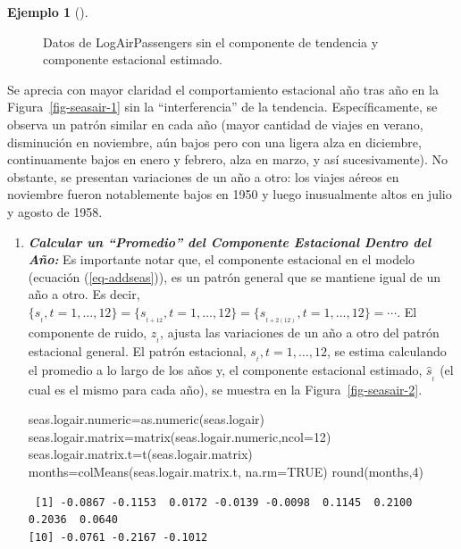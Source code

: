 \documentclass[
  us-letterpaper,
]{scrreprt}
\newenvironment{Shaded}{\begin{snugshade}}{\end{snugshade}}
\newcommand{\AttributeTok}[1]{\textcolor[rgb]{0.40,0.45,0.13}{#1}}
\newcommand{\ConstantTok}[1]{\textcolor[rgb]{0.56,0.35,0.01}{#1}}
\newcommand{\DecValTok}[1]{\textcolor[rgb]{0.68,0.00,0.00}{#1}}
\newcommand{\FunctionTok}[1]{\textcolor[rgb]{0.28,0.35,0.67}{#1}}
\newcommand{\NormalTok}[1]{\textcolor[rgb]{0.00,0.23,0.31}{#1}}
\newcommand{\OtherTok}[1]{\textcolor[rgb]{0.00,0.23,0.31}{#1}}
\theoremstyle{plain}
\theoremstyle{definition}
\theoremstyle{definition}
\newtheorem{example}{Ejemplo}[chapter]
\theoremstyle{plain}
\theoremstyle{remark}
\begin{document}
\begin{example}[]
\begin{tcolorbox}
\begin{figure}[H]
\caption{\label{fig-seasair}Datos de LogAirPassengers sin el componente
de tendencia y componente estacional estimado.}

\end{figure}%

Se aprecia con mayor claridad el comportamiento estacional año tras año
en la Figura~\ref{fig-seasair-1} sin la ``interferencia'' de la
tendencia. Específicamente, se observa un patrón similar en cada año
(mayor cantidad de viajes en verano, disminución en noviembre, aún bajos
pero con una ligera alza en diciembre, continuamente bajos en enero y
febrero, alza en marzo, y así sucesivamente). No obstante, se presentan
variaciones de un año a otro: los viajes aéreos en noviembre fueron
notablemente bajos en 1950 y luego inusualmente altos en julio y agosto
de 1958.

\begin{enumerate}
\def\labelenumi{\alph{enumi}.}
\setcounter{enumi}{2}
\item
  \textbf{\emph{Calcular un ``Promedio'' del Componente Estacional
  Dentro del Año:}} Es importante notar que, el componente estacional en
  el modelo (ecuación (\ref{eq-addseas})), es un patrón general que se
  mantiene igual de un año a otro. Es
  decir,\(\{s_{_t}, t=1,\ldots,12\} = \{s_{_{t+12}},t=1,\ldots,12\} =\{s_{_{t+2(12)}}, t=1,\ldots,12\}=\cdots.\)
  El componente de ruido, \(z_{_t}\), ajusta las variaciones de un año a
  otro del patrón estacional general. El patrón estacional,
  \(s_{_t}, t=1,\ldots,12\), se estima calculando el promedio a lo largo
  de los años y, el componente estacional estimado, \(\hat{s}_{_t}\) (el
  cual es el mismo para cada año), se muestra en la
  Figura~\ref{fig-seasair-2}.

\begin{Shaded}
\begin{Highlighting}[]
\NormalTok{seas.logair.numeric}\OtherTok{=}\FunctionTok{as.numeric}\NormalTok{(seas.logair)}
\NormalTok{seas.logair.matrix}\OtherTok{=}\FunctionTok{matrix}\NormalTok{(seas.logair.numeric,}\AttributeTok{ncol=}\DecValTok{12}\NormalTok{)}
\NormalTok{seas.logair.matrix.t}\OtherTok{=}\FunctionTok{t}\NormalTok{(seas.logair.matrix)}
\NormalTok{months}\OtherTok{=}\FunctionTok{colMeans}\NormalTok{(seas.logair.matrix.t, }\AttributeTok{na.rm=}\ConstantTok{TRUE}\NormalTok{)}
\FunctionTok{round}\NormalTok{(months,}\DecValTok{4}\NormalTok{)}
\end{Highlighting}
\end{Shaded}

\begin{verbatim}
 [1] -0.0867 -0.1153  0.0172 -0.0139 -0.0098  0.1145  0.2100  0.2036  0.0640
[10] -0.0761 -0.2167 -0.1012
\end{verbatim}


\end{enumerate}
\end{tcolorbox}
\end{example}
\end{document}
